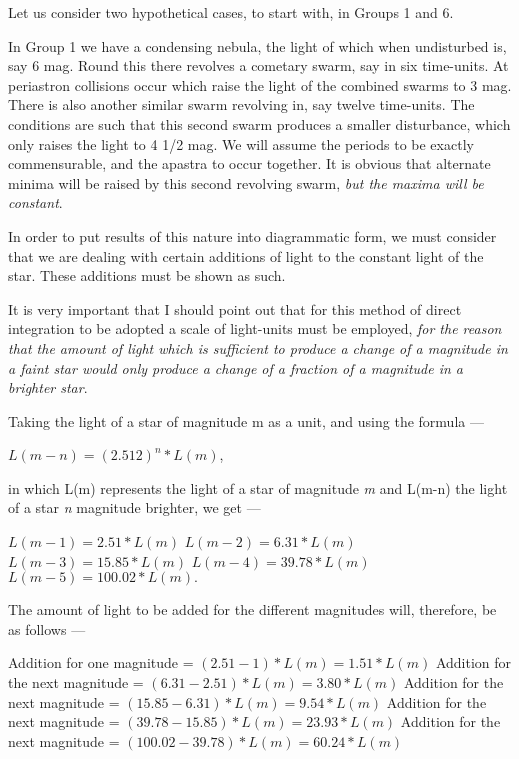 \documentclass[a4paper, 12pt, oneside, polutonikogreek, english]{article}
\begin{document}
Let us consider two hypothetical cases, to start with, in Groups 1 and 6.

In Group 1 we have a condensing nebula, the light of which when undisturbed is, say 6 mag. Round this there revolves a cometary swarm, say in six time-units. At periastron collisions occur which raise the light of the combined swarms to 3 mag. There is also another similar swarm revolving in, say twelve time-units. The conditions are such that this second swarm produces a smaller disturbance, which only raises the light to 4 1/2 mag. We will assume the periods to be exactly commensurable, and the apastra to occur together. It is obvious that alternate minima will be raised by this second revolving swarm, \emph{but the maxima will be constant}.

In order to put results of this nature into diagrammatic form, we must consider that we are dealing with certain additions of light to the constant light of the star. These additions must be shown as such.

It is very important that I should point out that for this method of direct integration to be adopted a scale of light-units must be employed, \emph{for the reason that the amount of light which is sufficient to produce a change of a magnitude in a faint star would only produce a change of a fraction of a magnitude in a brighter star}.

Taking the light of a star of magnitude m as a unit, and using the formula ---

$L(m-n) = (2.512)^n * L(m)$,

in which L(m) represents the light of a star of magnitude \emph{m} and L(m-n) the light of a star \emph{n} magnitude brighter, we get ---

$L(m-1) = 2.51 * L(m)$ 
$L(m-2) = 6.31 * L(m)$
$L(m-3) = 15.85 * L(m)$
$L(m-4) = 39.78 * L(m)$
$L(m-5) = 100.02 * L(m).$

The amount of light to be added for the different magnitudes will, therefore, be as follows ---

Addition for one magnitude = $(2.51 - 1) * L(m) = 1.51 * L(m)$ 
Addition for the next magnitude = $(6.31 - 2.51) * L(m) = 3.80 * L(m)$
Addition for the next magnitude = $(15.85 - 6.31) * L(m) = 9.54 * L(m)$ 
Addition for the next magnitude = $(39.78 - 15.85) * L(m) = 23.93 * L(m)$
Addition for the next magnitude = $(100.02 - 39.78) * L(m) = 60.24 * L(m)$
\end{document}
